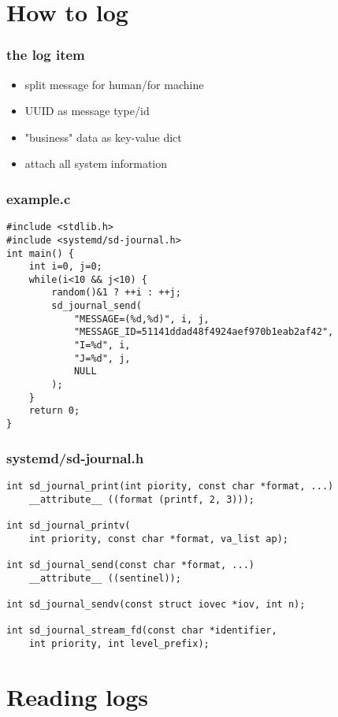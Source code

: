 \documentclass{beamer}
\begin{document}
\section{How to log}

\begin{frame}[fragile]
    \frametitle{the log item}
    \begin{itemize}
    \item split message for human/for machine
    \item UUID as message type/id
    \item "business" data as key-value dict
    \item attach all system information
    \end{itemize}
\end{frame}

\begin{frame}[fragile]
    \frametitle{example.c}
    \begin{verbatim}
#include <stdlib.h>
#include <systemd/sd-journal.h>
int main() {
    int i=0, j=0;
    while(i<10 && j<10) {
        random()&1 ? ++i : ++j;
        sd_journal_send(
            "MESSAGE=(%d,%d)", i, j,
            "MESSAGE_ID=51141ddad48f4924aef970b1eab2af42",
            "I=%d", i, 
            "J=%d", j,
            NULL
        );
    }
    return 0;
}
    \end{verbatim}
\end{frame}

\begin{frame}[fragile]
    \frametitle{systemd/sd-journal.h}
    \begin{verbatim}
int sd_journal_print(int piority, const char *format, ...)
    __attribute__ ((format (printf, 2, 3)));

int sd_journal_printv(
    int priority, const char *format, va_list ap);

int sd_journal_send(const char *format, ...)
    __attribute__ ((sentinel));

int sd_journal_sendv(const struct iovec *iov, int n);

int sd_journal_stream_fd(const char *identifier, 
    int priority, int level_prefix);
    \end{verbatim}
\end{frame}

\section{Reading logs}
\end{document}
